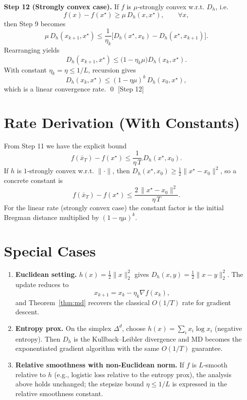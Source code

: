 \documentclass{article}
\newcommand{\Breg}{D_{h}}
\begin{document}
\noindent\textbf{Step 12 (Strongly convex case).}
If $f$ is $\mu$‑strongly convex w.r.t. $\Breg$, i.e.
\[
f(x)-f(x^{\star})\ge \mu\,\Breg(x,x^{\star}),\qquad\forall x,
\]
then Step 9 becomes
\[
\mu\,\Breg(x_{k+1},x^{\star})\le\frac{1}{\eta_k}\bigl[\Breg(x^{\star},x_k)-\Breg(x^{\star},x_{k+1})\bigr].
\]
Rearranging yields
\[
\Breg(x_{k+1},x^{\star})\le\bigl(1-\eta_k\mu\bigr)\Breg(x_k,x^{\star}).
\]
With constant $\eta_k=\eta\le1/L$, recursion gives
\[
\Breg(x_{k},x^{\star})\le(1-\eta\mu)^{k}\,\Breg(x_0,x^{\star}),
\]
which is a linear convergence rate. \hfill\qed
[Step 12]

\section*{Rate Derivation (With Constants)}
From Step 11 we have the explicit bound
\[
f(\bar x_T)-f(x^{\star})\le \frac{1}{\eta\,T}\,\Breg(x^{\star},x_0).
\]
If $h$ is $1$‑strongly convex w.r.t. $\|\cdot\|$, then $\Breg(x^{\star},x_0)\ge \tfrac12\|x^{\star}-x_0\|^{2}$, so a concrete constant is
\[
f(\bar x_T)-f(x^{\star})\le \frac{2\,\|x^{\star}-x_0\|^{2}}{\eta\,T}.
\]
For the linear rate (strongly convex case) the constant factor is the initial Bregman distance multiplied by $(1-\eta\mu)^{k}$.

\section*{Special Cases}
\begin{enumerate}[label=\arabic*.]
\item \textbf{Euclidean setting.} $h(x)=\tfrac12\|x\|_{2}^{2}$ gives $\Breg(x,y)=\tfrac12\|x-y\|_{2}^{2}$. The update reduces to
\[
x_{k+1}=x_k-\eta_k\nabla f(x_k),
\]
and Theorem~\ref{thm:md} recovers the classical $O(1/T)$ rate for gradient descent.
\item \textbf{Entropy prox.} On the simplex $\Delta^{d}$, choose $h(x)=\sum_{i}x_i\log x_i$ (negative entropy). Then $\Breg$ is the Kullback–Leibler divergence and MD becomes the exponentiated gradient algorithm with the same $O(1/T)$ guarantee.
\item \textbf{Relative smoothness with non‑Euclidean norm.} If $f$ is $L$‑smooth relative to $h$ (e.g., logistic loss relative to the entropy prox), the analysis above holds unchanged; the stepsize bound $\eta\le 1/L$ is expressed in the relative smoothness constant.
\end{enumerate}
\end{document}
